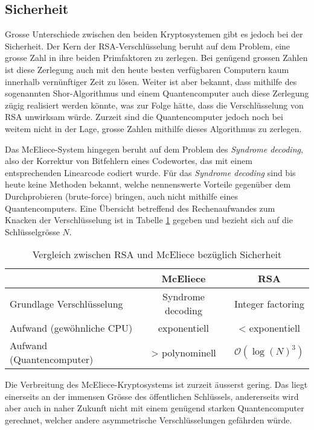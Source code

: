 \subsection{Sicherheit}
Grosse Unterschiede zwischen den beiden Kryptosystemen gibt es jedoch bei der Sicherheit.
%
Der Kern der RSA-Verschlüsselung beruht auf dem Problem, eine grosse Zahl in ihre beiden Primfaktoren zu zerlegen.
%
Bei genügend grossen Zahlen ist diese Zerlegung auch mit den heute besten verfügbaren Computern kaum innerhalb vernünftiger Zeit zu lösen.
Weiter ist aber bekannt,
dass mithilfe des sogenannten Shor-Algorithmus \cite{mceliece:shor} und einem Quantencomputer auch diese Zerlegung zügig realisiert werden könnte,
%
%
%
was zur Folge hätte, dass die Verschlüsselung von RSA unwirksam würde.
Zurzeit sind die Quantencomputer jedoch noch bei weitem nicht in der Lage, grosse Zahlen mithilfe dieses Algorithmus zu zerlegen.

Das McEliece-System hingegen beruht auf dem Problem des {\em Syndrome decoding}, also der Korrektur von Bitfehlern eines Codewortes, das mit einem entsprechenden Linearcode codiert wurde.
Für das {\em Syndrome decoding} sind bis heute keine Methoden bekannt,
welche nennenswerte Vorteile gegenüber dem Durchprobieren (brute-force) bringen,
auch nicht mithilfe eines Quantencomputers.
Eine Übersicht betreffend des Rechenaufwandes zum Knacken der Verschlüsselung ist in Tabelle \ref{mceliece:tab:comparison_security} gegeben und bezieht sich auf die Schlüsselgrösse $N$.
\begin{table}
    \begin{center}
        \begin{tabular}{l|c|c}
                                    &McEliece          &RSA              \\
        \hline
            Grundlage Verschlüsselung &Syndrome decoding &Integer factoring\\
            Aufwand (gewöhnliche CPU) &exponentiell       &< exponentiell    \\
            Aufwand (Quantencomputer) &> polynominell      &$\mathcal{O}(\log(N)^3)$
        \end{tabular}
    \end{center}
    \caption{\label{mceliece:tab:comparison_security}Vergleich zwischen RSA und McEliece bezüglich Sicherheit}
\end{table}

Die Verbreitung des McEliece-Kryptosystems ist zurzeit äusserst gering.
Das liegt einerseits an der immensen Grösse des öffentlichen Schlüssels,
andererseits wird aber auch in naher Zukunft nicht mit einem genügend starken Quantencomputer gerechnet,
welcher andere asymmetrische Verschlüsselungen gefährden würde.
